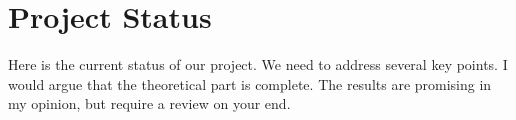 \section{Project Status}

Here is the current status of our project. We need to address several key points.
I would argue that the theoretical part is complete. The results are promising in my opinion, but require a review on your end.  
\vspace{2cm}

\listtodousers